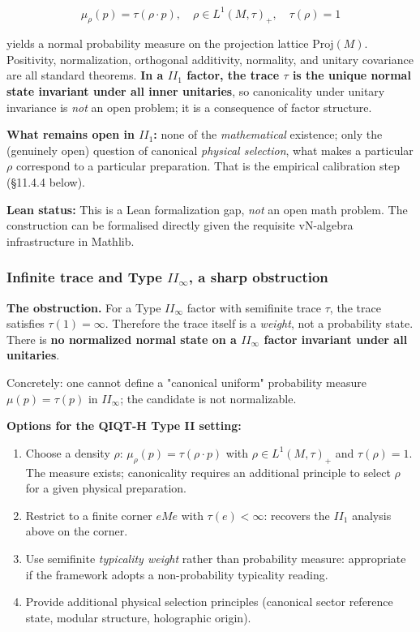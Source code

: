 \documentclass[11pt,a4paper]{article}
\begin{document}
\[
\mu_\rho(p) = \tau(\rho \cdot p), \quad \rho \in L^1(M, \tau)_+, \quad \tau(\rho) = 1
\]

yields a normal probability measure on the projection lattice $\mathrm{Proj}(M)$. Positivity, normalization, orthogonal additivity, normality, and unitary covariance are all standard theorems. \textbf{In a $II_1$ factor, the trace $\tau$ is the unique normal state invariant under all inner unitaries}, so canonicality under unitary invariance is \emph{not} an open problem; it is a consequence of factor structure.

\textbf{What remains open in $II_1$:} none of the \emph{mathematical} existence; only the (genuinely open) question of canonical \emph{physical selection}, what makes a particular $\rho$ correspond to a particular preparation. That is the empirical calibration step (§11.4.4 below).

\textbf{Lean status:} This is a Lean formalization gap, \emph{not} an open math problem. The construction can be formalised directly given the requisite vN-algebra infrastructure in Mathlib.

\subsubsection{Infinite trace and Type $II_\infty$, a sharp obstruction}

\textbf{The obstruction.} For a Type $II_\infty$ factor with semifinite trace $\tau$, the trace satisfies $\tau(1) = \infty$. Therefore the trace itself is a \emph{weight}, not a probability state. There is \textbf{no normalized normal state on a $II_\infty$ factor invariant under all unitaries}.

Concretely: one cannot define a "canonical uniform" probability measure $\mu(p) = \tau(p)$ in $II_\infty$; the candidate is not normalizable.

\textbf{Options for the QIQT-H Type II setting:}
\begin{enumerate}
  \item Choose a density $\rho$: $\mu_\rho(p) = \tau(\rho \cdot p)$ with $\rho \in L^1(M, \tau)_+$ and $\tau(\rho) = 1$. The measure exists; canonicality requires an additional principle to select $\rho$ for a given physical preparation.
  \item Restrict to a finite corner $eMe$ with $\tau(e) < \infty$: recovers the $II_1$ analysis above on the corner.
  \item Use semifinite \emph{typicality weight} rather than probability measure: appropriate if the framework adopts a non-probability typicality reading.
  \item Provide additional physical selection principles (canonical sector reference state, modular structure, holographic origin).
\end{enumerate}
\end{document}
